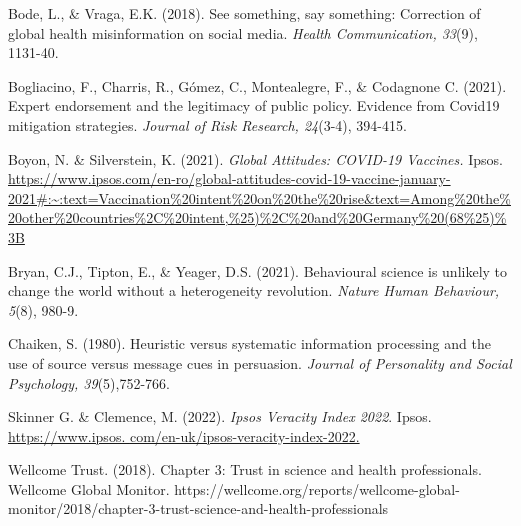 \documentclass[authordate, empirical]{jote-new-article}
\begin{document}
	Bode, L., \& Vraga, E.K. (2018). See something, say something: Correction of global health misinformation on social media. \emph{Health Communication, 33}(9), 1131-40.







	Bogliacino, F., Charris, R., Gómez, C., Montealegre, F., \& Codagnone C. (2021). Expert endorsement and the legitimacy of public policy. Evidence from Covid19 mitigation strategies. \emph{Journal of Risk Research, 24}(3-4), 394-415.







	Boyon, N. \& Silverstein, K. (2021). \emph{Global Attitudes: COVID-19 Vaccines.} Ipsos. \href{https://www.ipsos.com/en-ro/global-attitudes-covid-19-vaccine-january-2021}{https://www.ipsos.com/en-ro/global-attitudes-covid-19-vaccine-january-2021\#:\textasciitilde{}:text=Vaccination\%20intent\%20on\%20the\%20rise\&text=Among\%20the\%20other\%20countries\%2C\%20intent,\%25)\%2C\%20and\%20Germany\%20(68\%25)\%3B}







	Bryan, C.J., Tipton, E., \& Yeager, D.S. (2021). Behavioural science is unlikely to change the world without a heterogeneity revolution. \emph{Nature Human Behaviour, 5}(8), 980-9.







	Chaiken, S. (1980). Heuristic versus systematic information processing and the use of source versus message cues in persuasion. \emph{Journal of Personality and Social Psychology, 39}(5),752-766.







	Skinner G. \& Clemence, M. (2022). \emph{Ipsos Veracity Index 2022}. Ipsos. \href{https://www.ipsos.com/en-uk/ipsos-veracity-index-2022}{https://www.ipsos. }\href{https://www.ipsos.com/en-uk/ipsos-veracity-index-2022}{com/en-uk/ipsos-veracity-index-2022.}







	Wellcome Trust. (2018). Chapter 3: Trust in science and health professionals. Wellcome Global Monitor. https://wellcome.org/reports/wellcome-global-monitor/2018/chapter-3-trust-science-and-health-professionals
\end{document}
